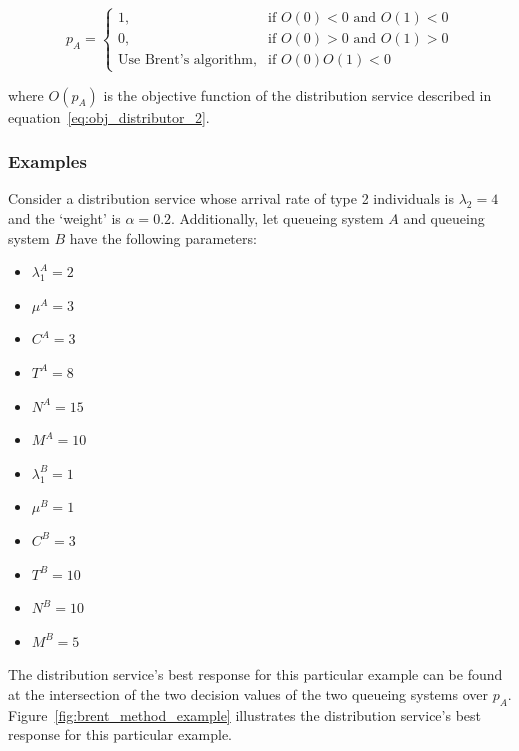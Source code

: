 \begin{equation}\label{eq:obj_distributor_implementation}
    p_A = \begin{cases}
        1, & \text{if } O(0) < 0 \text{ and } O(1) < 0 \\
        0, & \text{if } O(0) > 0 \text{ and } O(1) > 0 \\
        \text{Use Brent's algorithm}, & \text{if } O(0)O(1) < 0
    \end{cases}
\end{equation}

where \(O(p_A)\) is the objective function of the distribution service described
in equation~\eqref{eq:obj_distributor_2}.

\subsubsection{Examples}\label{sec:brent_method_example}
Consider a distribution service whose arrival rate of type 2 individuals is
\(\lambda_2 = 4\) and the `weight' is \(\alpha = 0.2\).
Additionally, let queueing system \(A\) and queueing system \(B\) have the
following parameters:

\begin{multicols}{2}
    \begin{itemize}
        \item \(\lambda_1^A = 2\)
        \item \(\mu^A = 3\)
        \item \(C^A = 3\)
        \item \(T^A = 8\)
        \item \(N^A = 15\)
        \item \(M^A = 10\)
        \item \(\lambda_1^B = 1\)
        \item \(\mu^B = 1\)
        \item \(C^B = 3\)
        \item \(T^B = 10\)
        \item \(N^B = 10\)
        \item \(M^B = 5\)
    \end{itemize}
\end{multicols}

The distribution service's best response for this particular example can be
found at the intersection of the two decision values of the two queueing
systems over \(p_A\).
Figure~\ref{fig:brent_method_example} illustrates the distribution service's
best response for this particular example.

